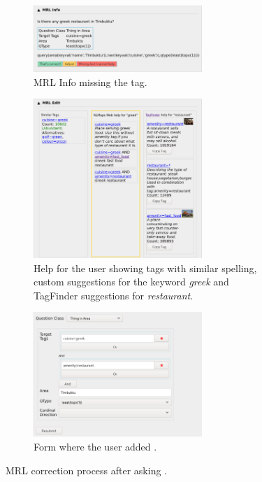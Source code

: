\begin{figure}[h]
  \centering
  \begin{subfigure}{\textwidth}
    \centering
    \includegraphics[width=0.7\textwidth]{fig/screenshot_greek_mrl.png}
    \caption{MRL Info missing the  tag.}
  \end{subfigure}
  \begin{subfigure}{\textwidth}
    \centering
    \includegraphics[width=0.7\textwidth]{fig/screenshot_greek_help.png}
    \caption{Help for the user showing tags with similar spelling, custom
      suggestions for the keyword \emph{greek} and TagFinder suggestions for
      \emph{restaurant}.}
  \end{subfigure}
  \begin{subfigure}{\textwidth}
    \centering
    \includegraphics[width=0.7\textwidth]{fig/screenshot_greek_form.png}
    \caption{Form where the user added .}
  \end{subfigure}
  \caption[MRL correction process]{MRL correction process after asking .}
  \label{fig:correction-process}
\end{figure}

